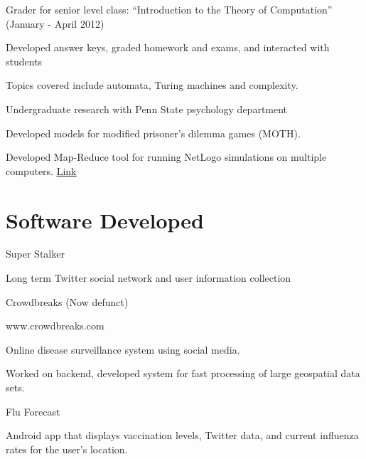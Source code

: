 \documentclass[margin,line]{res}
\newcommand{\linkToUrl}[1]{{\color{blue}\underline{\href{#1}{Link}}}}
\newenvironment{list1}{
  \begin{list}{\ding{113}}{%
      \setlength{\itemsep}{0in}
      \setlength{\parsep}{0in} \setlength{\parskip}{0in}
      \setlength{\topsep}{0in} \setlength{\partopsep}{0in} 
      \setlength{\leftmargin}{0.17in}}}{\end{list}}
\begin{document}
\begin{resume}
Grader for senior level class: ``Introduction to the Theory of Computation'' (January - April 2012)
\begin{list1}
\item[] Developed answer keys, graded homework and exams, and interacted with students
\item[] Topics covered include automata, Turing machines and complexity.
\end{list1}
Undergraduate research with Penn State psychology department%
\begin{list1}
\item[] Developed models for modified prisoner's dilemma games (MOTH).
\item[] Developed Map-Reduce tool for running NetLogo simulations on multiple computers. \linkToUrl{http://bit.ly/12UQ4cq}
\end{list1}




\section{\sc Software Developed}
Super Stalker
\begin{list1}
\item[] Long term Twitter social network and user information collection
\end{list1}

Crowdbreaks (Now defunct)
\begin{list1}
\item[] www.crowdbreaks.com
\item[] Online disease surveillance system using social media.
\item[] Worked on backend, developed system for fast processing of large geospatial data sets.
\end{list1}

Flu Forecast
\begin{list1}
\item[] Android app that displays vaccination levels, Twitter data, and current influenza rates for the user's location.
\end{list1}


\end{resume}
\end{document}

